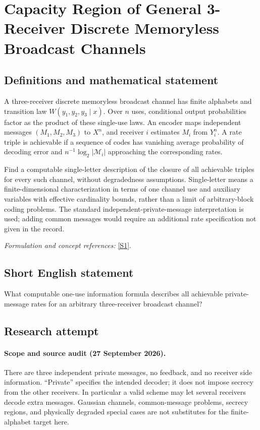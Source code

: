 \documentclass[11pt]{article}
\begin{document}
\section*{\texorpdfstring{Capacity Region of General 3-Receiver Discrete Memoryless Broadcast Channels}{Capacity Region of General 3-Receiver Discrete Memoryless Broadcast Channels}}\label{458}
\subsection{Definitions and mathematical statement}
A three-receiver discrete memoryless broadcast channel has finite alphabets and transition law $W(y_1,y_2,y_3\mid x)$. Over $n$ uses, conditional output probabilities factor as the product of these single-use laws. An encoder maps independent messages $(M_1,M_2,M_3)$ to $X^n$, and receiver $i$ estimates $M_i$ from $Y_i^n$. A rate triple is achievable if a sequence of codes has vanishing average probability of decoding error and $n^{-1}\log_2|\mathcal M_i|$ approaching the corresponding rates.

Find a computable single-letter description of the closure of all achievable triples for every such channel, without degradedness assumptions. Single-letter means a finite-dimensional characterization in terms of one channel use and auxiliary variables with effective cardinality bounds, rather than a limit of arbitrary-block coding problems. The standard independent-private-message interpretation is used; adding common messages would require an additional rate specification not given in the record.
\par\smallskip\textit{Formulation and concept references:} \href{https://doi.org/10.1017/CBO9780511978166}{[S1]}.

\subsection{Short English statement}
What computable one-use information formula describes all achievable private-message rates for an arbitrary three-receiver broadcast channel?
\subsection{Research attempt}
\paragraph{Scope and source audit (27 September 2026).}
There are three independent private messages, no feedback, and no receiver
side information. ``Private'' specifies the intended decoder; it does
not impose secrecy from the other receivers. In particular a valid scheme
may let several receivers decode extra messages. Gaussian channels,
common-message problems, secrecy regions, and physically degraded
special cases are not substitutes for the finite-alphabet target here.
\end{document}
